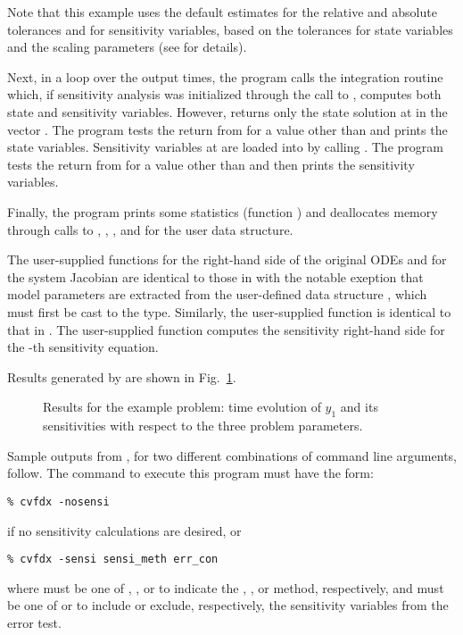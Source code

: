 Note that this example uses the default estimates for the relative and absolute tolerances 
 and  for sensitivity variables, based on the tolerances for state 
variables and the scaling parameters  (see  for details).

Next, in a loop over the  output times, the program calls the integration
routine  which, if sensitivity analysis was initialized through the call
to , computes both state and sensitivity variables. However,
 returns only the state solution at  in the vector .
The program tests the return from  for a value other than  and
prints the state variables.
Sensitivity variables at  are loaded into  by calling .
The program tests the return from  for a value other than  
and then prints the sensitivity variables.

Finally, the program prints some statistics (function ) 
and deallocates memory through calls
to , , 
, and  for the user data structure.

The user-supplied functions  for the right-hand side of the original ODEs and
 for the system Jacobian are identical to those in  with the 
notable exeption that model parameters are extracted from the user-defined data structure
, which must first be cast to the  type. Similarly, the
user-supplied function  is identical to that in .
The user-supplied function  computes the sensitivity right-hand side for the -th 
sensitivity equation.

Results generated by  are shown in Fig.~\ref{f:cvfdx}. 
\begin{figure}
  {\centerline{}}
  \caption{Results for the  example problem:
    time evolution of $y_1$ and its sensitivities with respect to the
    three problem parameters.}
  \label{f:cvfdx}
\end{figure}
Sample outputs from , for two different combinations of command line arguments, 
follow. The command to execute this program must have the form:
\begin{verbatim}
% cvfdx -nosensi
\end{verbatim} 
if no sensitivity calculations are desired, or
\begin{verbatim}
% cvfdx -sensi sensi_meth err_con
\end{verbatim}
where  must be one of , , or  to
indicate the , , or  method,
respectively, and  must be one of  or  to
include or exclude, respectively, the sensitivity variables from the error test.


